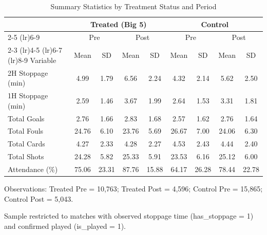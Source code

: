 \begin{table}[htbp]
\centering
\caption{Summary Statistics by Treatment Status and Period}
\label{tab:summary_stats}
\small
\begin{threeparttable}
\begin{tabular}{lcccccccc}
\toprule
 & \multicolumn{4}{c}{Treated (Big 5)} & \multicolumn{4}{c}{Control} \\
\cmidrule(lr){2-5} \cmidrule(lr){6-9}
 & \multicolumn{2}{c}{Pre} & \multicolumn{2}{c}{Post} & \multicolumn{2}{c}{Pre} & \multicolumn{2}{c}{Post} \\
\cmidrule(lr){2-3} \cmidrule(lr){4-5} \cmidrule(lr){6-7} \cmidrule(lr){8-9}
Variable & Mean & SD & Mean & SD & Mean & SD & Mean & SD \\
\midrule
2H Stoppage (min) & 4.99 & 1.79 & 6.56 & 2.24 & 4.32 & 2.14 & 5.62 & 2.50 \\
1H Stoppage (min) & 2.59 & 1.46 & 3.67 & 1.99 & 2.64 & 1.53 & 3.31 & 1.81 \\
Total Goals & 2.76 & 1.66 & 2.83 & 1.68 & 2.57 & 1.62 & 2.76 & 1.64 \\
Total Fouls & 24.76 & 6.10 & 23.76 & 5.69 & 26.67 & 7.00 & 24.06 & 6.30 \\
Total Cards & 4.27 & 2.33 & 4.28 & 2.27 & 4.53 & 2.43 & 4.44 & 2.40 \\
Total Shots & 24.28 & 5.82 & 25.33 & 5.91 & 23.53 & 6.16 & 25.12 & 6.00 \\
Attendance (\%) & 75.06 & 23.31 & 87.76 & 15.88 & 64.17 & 26.28 & 78.44 & 22.78 \\
\bottomrule
\end{tabular}
\begin{tablenotes}
\small
\item Observations: Treated Pre = 10,763; Treated Post = 4,596; Control Pre = 15,865; Control Post = 5,043.
\item Sample restricted to matches with observed stoppage time (has\_stoppage = 1) and confirmed played (is\_played = 1).
\end{tablenotes}
\end{threeparttable}
\end{table}
